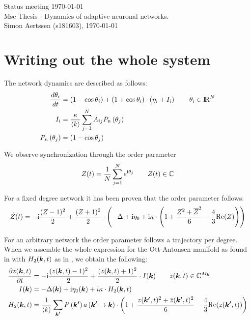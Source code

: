 


\mainmatter

Status meeting \today \\
Msc Thesis - Dynamics of adaptive neuronal networks. \\
Simon Aertssen (s181603), \today \\ 

\section{Writing out the whole system}
The network dynamics are described as follows:
\begin{align}
\frac{d \theta_i}{d t} &= (1 - \cos\theta_i) + (1 + \cos\theta_i)\cdot\left(\eta_i + I_i \right) \qquad \theta_i \in {\rm I\!R}^N \nonumber \\
I_{i} &= \frac{\kappa}{\langle k\rangle} \sum_{j=1}^{N} A_{i j} P_{n}\left(\theta_{j}\right) \label{eq:FullThetaNeuronNetwork} \\
P_{n}\left(\theta_{j}\right) &= (1 - \cos\theta_j) \nonumber
\end{align}

We observe synchronization through the order parameter
\begin{align}
Z(t) = \frac{1}{N} \sum_{j=1}^N e^{{\rm{i}}\theta_j}  \qquad Z(t) \in {\mathbb{C}} \label{eq:orderparameter}
\end{align}

For a fixed degree network it has been proven that the order parameter follows:
\begin{align}
\dot{Z}(t)= -{\rm{i}} \frac{(Z-1)^2}{2}+\frac{(Z+1)^2}{2} \cdot \left(-\Delta+ {\rm{i}}\eta_{0}
+ {\rm{i}} \kappa \cdot \left(1+\frac{Z^{2} + \overline{Z}^{2} }{6} - \frac{4}{3} {\operatorname{Re}}(Z)\right)\right) \label{eq:MeanField}
\end{align}
    
For an arbitrary network the order parameter follows a trajectory per degree. When we assemble the whole expression for the Ott-Antonsen manifold as found in \cite{OttAntonsen2017} with $H_2({\boldsymbol{k}},t)$ as in \cite{Martens2020}, we obtain the following:
\begin{align}
\frac{\partial z({\boldsymbol{k}}, t)}{\partial t} &= -{\rm{i}} \frac{(z({\boldsymbol{k}}, t)-1)^{2}}{2} + \frac{(z({\boldsymbol{k}}, t)+1)^{2}}{2} \cdot I({\boldsymbol{k}}) \qquad z({\boldsymbol{k}},t) \in {\mathbb{C}}^{M_{\boldsymbol{k}}} \nonumber \\
I({\boldsymbol{k}}) &= -\Delta({\boldsymbol{k}}) + {\rm{i}} \eta_{0}({\boldsymbol{k}}) + i \kappa \cdot H_2({\boldsymbol{k}},t) \label{eq:OttAntonsenSystemFull} \\
H_2({\boldsymbol{k}},t) &= \frac{1}{{\langle k\rangle}} \sum_{{\boldsymbol{k'}}} P\left({\boldsymbol{k'}}\right) a\left({\boldsymbol{k'}} \rightarrow {\boldsymbol{k}}\right) \cdot \left( 1 + \frac{z({\boldsymbol{k'}}, t)^2 + \overline{z}({\boldsymbol{k'}}, t)^2}{6} - \frac{4}{3} {\operatorname{Re}}(z({\boldsymbol{k'}}, t)) \right) \nonumber
\end{align}

